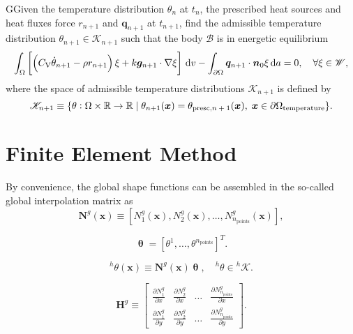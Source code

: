  \begin{problem}
     GGiven the temperature distribution $\theta_n$ at $t_n$, the prescribed heat sources and heat fluxes force $r_{n+1}$ and $\bm q_{n+1}$ at $t_{n+1}$, find the admissible temperature distribution $\theta_{n+1}\in\mathscr{K}_{n+1}$ such that the body $\mathscr{B}$ is in energetic equilibrium
             \begin{equation}
         \int_\Omega   \left[\left(C_\mathrm{V} \dot \theta_{n+1} - \rho r_{n+1}\right) \xi +k \bm g_{n+1}\cdot \nabla \xi\right]\,\mathrm{d} v - \int_{\partial\Omega} \bm q_{n+1}\cdot \bm n_0 \xi\,\mathrm{d} a = 0,\quad \forall \xi \in \mathscr{W},
     \end{equation}
     where the space of admissible temperature distributions $\mathscr{K}_{n+1}$ is defined by
     \begin{equation}
             \mathscr{K}_{n+1}\equiv \{\theta:\Omega\times \mathbb{R}\to \mathbb{R}\;|\;\theta_{n+1}(\bm x) = \theta_\text{presc,$n+1$}(\bm{x}),\;\bm{x}\in\partial \Omega_\text{temperature}\}.
     \end{equation}
 \end{problem}

\section{Finite Element Method}

By convenience, the global shape functions can be assembled in the so-called global interpolation matrix as
\begin{equation}
\mathbf{N}^{g}(\boldsymbol{x}) \equiv\left[N_1^g(\bm x), N_2^g(\bm x), \dots, N^g_{n_\text{points}}(\bm x)\right],
\end{equation}

\begin{equation}
 \bm \uptheta = \left[\theta^{1}, \dots, \theta^{n_{\text {points}}}\right]^{T}.
\end{equation}

\begin{highlight}
\begin{equation}
{ }^{h} \theta(\bm{x}) \equiv \mathbf{N}^{g}(\bm{x}) \bm{\uptheta}, \quad{ }^{h} \theta \in{ }^{h} \mathscr{K}.
\end{equation}
\end{highlight}

\begin{equation}
  \mathbf H^g\equiv \left[
  \begin{array}{cccc}
    \displaystyle{\frac{\partial N^g_1}{\partial x}} & \displaystyle{\frac{\partial N^g_2}{\partial x}} & \dots & \displaystyle{\frac{\partial N^g_{n_\text{points}}}{\partial x}} \\[10pt]
    \displaystyle{\frac{\partial N^g_1}{\partial y}} & \displaystyle{\frac{\partial N^g_2}{\partial y}} & \dots & \displaystyle{\frac{\partial N^g_{n_\text{points}}}{\partial y}}
  \end{array}
  \right].
\end{equation}

